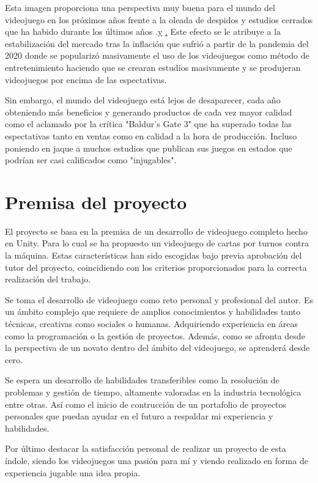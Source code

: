 Esta imagen proporciona una perspectiva muy buena para el mundo del videojuego en los próximos años frente a la oleada de despidos y estudios cerrados que ha habido durante los últimos años .\href{https://publish.obsidian.md/vg-layoffs/Archive/2024} y \href{https://www.gamesindustry.biz/topics/studio-closures}. Este efecto se le atribuye a la estabilización del mercado tras la inflación que sufrió a partir de la pandemia del 2020 donde se popularizó masivamente el uso de los videojuegos como método de entretenimiento haciendo que se crearan estudios masivamente y se produjeran videojuegos por encima de las espectativas.

Sin embargo, el mundo del videojuego está lejos de desaparecer, cada año obteniendo más beneficios y generando productos de cada vez mayor calidad como el aclamado por la crítica "Baldur's Gate 3" que ha superado todas las espectativas tanto en ventas como en calidad a la hora de producción. Incluso poniendo en jaque a muchos estudios que publican sus juegos en estados que podrían ser casi calificados como "injugables".

\section{Premisa del proyecto}
El proyecto se basa en la premisa de un desarrollo de videojuego completo hecho en Unity. Para lo cual se ha propuesto un videojuego de cartas por turnos contra la máquina. Estas características han sido escogidas bajo previa aprobación del tutor del proyecto, coincidiendo con los criterios proporcionados para la correcta realización del trabajo.

Se toma el desarrollo de videojuego como reto personal y profesional del autor. Es un ámbito complejo que requiere de amplios conocimientos y habilidades tanto técnicas, creativas como sociales o humanas. Adquiriendo experiencia en áreas como la programación o la gestión de proyectos. Además, como se afronta desde la perspectiva de un novato dentro del ámbito del videojuego, se aprenderá desde cero.

Se espera un desarrollo de habilidades transferibles como la resolución de problemas y gestión de tiempo, altamente valoradas en la industria tecnológica entre otras. Así como el inicio de contrucción de un portafolio de proyectos personales que puedan ayudar en el futuro a respaldar mi experiencia y habilidades.

Por último destacar la satisfacción personal de realizar un proyecto de esta índole, siendo los videojuegos una pasión para mí y viendo realizado en forma de experiencia jugable una idea propia.